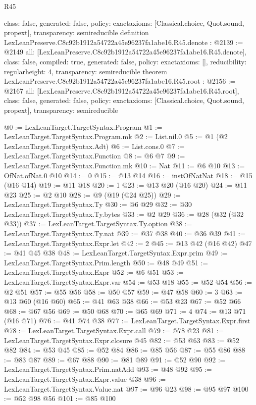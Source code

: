 \begin{lexlean}{R45}
\begin{coremodule}
{  class: false,
  generated: false,
  policy: exact{axioms: [Classical.choice, Quot.sound, propext]},
  transparency: semireducible
}
definition LexLeanPreserve.C8c92b1912a54722a45e96237fa1abe16.R45.denote : @2139 := @2149 {
  all: [LexLeanPreserve.C8c92b1912a54722a45e96237fa1abe16.R45.denote],
  class: false,
  compiled: true,
  generated: false,
  policy: exact{axioms: []},
  reducibility: regular{height: 4},
  transparency: semireducible
}
theorem LexLeanPreserve.C8c92b1912a54722a45e96237fa1abe16.R45.root : @2156 := @2167 {
  all: [LexLeanPreserve.C8c92b1912a54722a45e96237fa1abe16.R45.root],
  class: false,
  generated: false,
  policy: exact{axioms: [Classical.choice, Quot.sound, propext]},
  transparency: semireducible
}

@0 := LexLeanTarget.TargetSyntax.Program
@1 := LexLeanTarget.TargetSyntax.Program.mk
@2 := List.nil.{0}
@5 := @1 (@2 LexLeanTarget.TargetSyntax.Adt)
@6 := List.cons.{0}
@7 := LexLeanTarget.TargetSyntax.Function
@8 := @6 @7
@9 := LexLeanTarget.TargetSyntax.Function.mk
@10 := Nat
@11 := @6 @10
@13 := OfNat.ofNat.{0} @10
@14 := 0
@15 := @13 @14
@16 := instOfNatNat
@18 := @15 (@16 @14)
@19 := @11 @18
@20 := 1
@23 := @13 @20 (@16 @20)
@24 := @11 @23
@25 := @2 @10
@28 := @9 (@19 (@24 @25))
@29 := LexLeanTarget.TargetSyntax.Ty
@30 := @6 @29
@32 := @30 LexLeanTarget.TargetSyntax.Ty.bytes
@33 := @2 @29
@36 := @28 (@32 (@32 @33))
@37 := LexLeanTarget.TargetSyntax.Ty.option
@38 := LexLeanTarget.TargetSyntax.Ty.nat
@39 := @37 @38
@40 := @36 @39
@41 := LexLeanTarget.TargetSyntax.Expr.let
@42 := 2
@45 := @13 @42 (@16 @42)
@47 := @41 @45 @38
@48 := LexLeanTarget.TargetSyntax.Expr.prim
@49 := LexLeanTarget.TargetSyntax.Prim.length
@50 := @48 @49
@51 := LexLeanTarget.TargetSyntax.Expr
@52 := @6 @51
@53 := LexLeanTarget.TargetSyntax.Expr.var
@54 := @53 @18
@55 := @52 @54
@56 := @2 @51
@57 := @55 @56
@58 := @50 @57
@59 := @47 @58
@60 := 3
@63 := @13 @60 (@16 @60)
@65 := @41 @63 @38
@66 := @53 @23
@67 := @52 @66
@68 := @67 @56
@69 := @50 @68
@70 := @65 @69
@71 := 4
@74 := @13 @71 (@16 @71)
@76 := @41 @74 @38
@77 := LexLeanTarget.TargetSyntax.Expr.first
@78 := LexLeanTarget.TargetSyntax.Expr.call
@79 := @78 @23
@81 := LexLeanTarget.TargetSyntax.Expr.closure @45
@82 := @53 @63
@83 := @52 @82
@84 := @53 @45
@85 := @52 @84
@86 := @85 @56
@87 := @55 @86
@88 := @83 @87
@89 := @67 @88
@90 := @81 @89
@91 := @52 @90
@92 := LexLeanTarget.TargetSyntax.Prim.natAdd
@93 := @48 @92
@95 := LexLeanTarget.TargetSyntax.Expr.value @38
@96 := LexLeanTarget.TargetSyntax.Value.nat
@97 := @96 @23
@98 := @95 @97
@100 := @52 @98 @56
@101 := @85 @100

\end{coremodule}
\end{lexlean}

